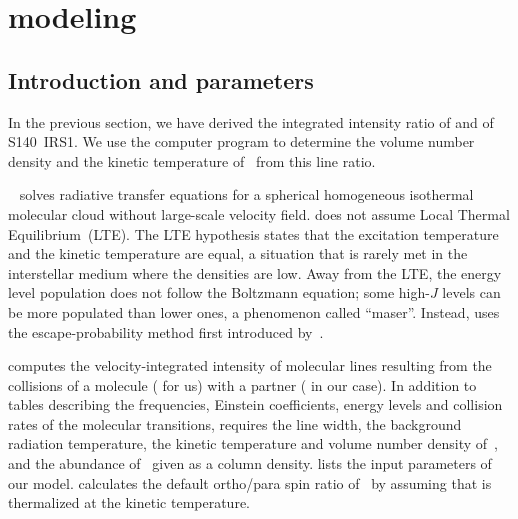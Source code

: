 \FloatBarrier
\section{\Radex{} modeling}



\subsection{Introduction and parameters}
In the previous section, we have derived the integrated intensity ratio of
 and  of S140~IRS1.
We use the computer program \radex{} to determine the volume number density and the kinetic temperature of~ from this line ratio.

\Radex{}~\parencite{vandertak2007radex} solves radiative transfer equations for a spherical homogeneous isothermal molecular cloud without large-scale velocity field.
\Radex{} does not assume Local Thermal Equilibrium~(LTE).
The LTE hypothesis states that the excitation temperature and the kinetic temperature are equal, a situation that is rarely met in the interstellar medium where the densities are low.
Away from the LTE, the energy level population does not follow the Boltzmann equation;
some high-$J$ levels can be more populated than lower ones, a phenomenon called ``maser''.
Instead, \radex{} uses the escape-probability method first introduced by~\textcite{sobolev1960}.

\Radex{} computes the velocity-integrated intensity of molecular lines resulting from the collisions of a molecule ( for us) with a partner ( in our case).
In addition to tables describing the frequencies, Einstein coefficients, energy levels and collision rates of the molecular transitions, \radex{} requires the line width, the background radiation temperature, the kinetic temperature and volume number density of~, and the abundance of~ given as a column density.
 lists the input parameters of our model.
\Radex{} calculates the default ortho/para spin ratio of~ by assuming that  is thermalized at the kinetic temperature.

